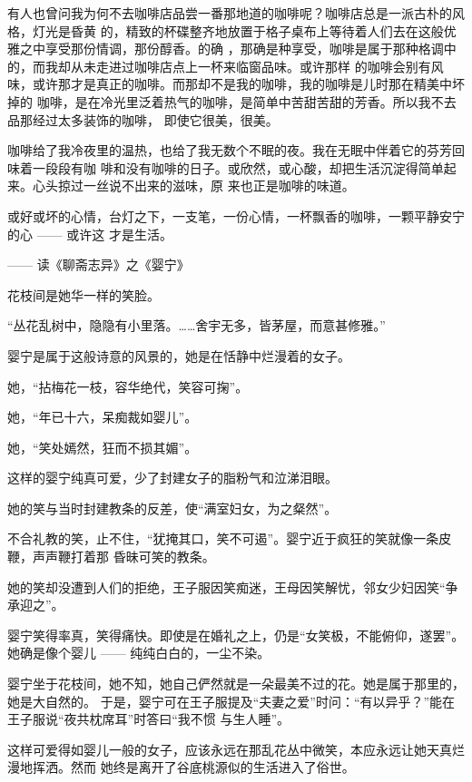 \documentclass[12pt,a4paper]{article}
\begin{document}
		有人也曾问我为何不去咖啡店品尝一番那地道的咖啡呢？咖啡店总是一派古朴的风格，灯光是昏黄
	的，精致的杯碟整齐地放置于格子桌布上等待着人们去在这般优雅之中享受那份情调，那份醇香。的确
	，那确是种享受，咖啡是属于那种格调中的，而我却从未走进过咖啡店点上一杯来临窗品味。或许那样
	的咖啡会别有风味，或许那才是真正的咖啡。而那却不是我的咖啡，我的咖啡是儿时那在精美中坏掉的
	咖啡，是在冷光里泛着热气的咖啡，是简单中苦甜苦甜的芳香。所以我不去品那经过太多装饰的咖啡，
	即使它很美，很美。

		咖啡给了我冷夜里的温热，也给了我无数个不眠的夜。我在无眠中伴着它的芬芳回味着一段段有咖
	啡和没有咖啡的日子。或欣然，或心酸，却把生活沉淀得简单起来。心头掠过一丝说不出来的滋味，原
	来也正是咖啡的味道。

		或好或坏的心情，台灯之下，一支笔，一份心情，一杯飘香的咖啡，一颗平静安宁的心 —— 或许这
	才是生活。

	\endwriting



		—— 读《聊斋志异》之《婴宁》

		花枝间是她华一样的笑脸。\par
		“丛花乱树中，隐隐有小里落。……舍宇无多，皆茅屋，而意甚修雅。”\par
		婴宁是属于这般诗意的风景的，她是在恬静中烂漫着的女子。\par
		她，“拈梅花一枝，容华绝代，笑容可掬”。\par
		她，“年已十六，呆痴裁如婴儿”。\par
		她，“笑处嫣然，狂而不损其媚”。\par
		这样的婴宁纯真可爱，少了封建女子的脂粉气和泣涕泪眼。\par
		她的笑与当时封建教条的反差，使“满室妇女，为之粲然”。

		不合礼教的笑，止不住，“犹掩其口，笑不可遏”。婴宁近于疯狂的笑就像一条皮鞭，声声鞭打着那
	昏昧可笑的教条。

		她的笑却没遭到人们的拒绝，王子服因笑痴迷，王母因笑解忧，邻女少妇因笑“争承迎之”。

		婴宁笑得率真，笑得痛快。即使是在婚礼之上，仍是“女笑极，不能俯仰，遂罢”。她确是像个婴儿
	—— 纯纯白白的，一尘不染。

		婴宁坐于花枝间，她不知，她自己俨然就是一朵最美不过的花。她是属于那里的，她是大自然的。
	于是，婴宁可在王子服提及“夫妻之爱”时问：“有以异乎？”能在王子服说“夜共枕席耳”时答曰“我不惯
	与生人睡”。

		这样可爱得如婴儿一般的女子，应该永远在那乱花丛中微笑，本应永远让她天真烂漫地挥洒。然而
	她终是离开了谷底桃源似的生活进入了俗世。
\end{document}
